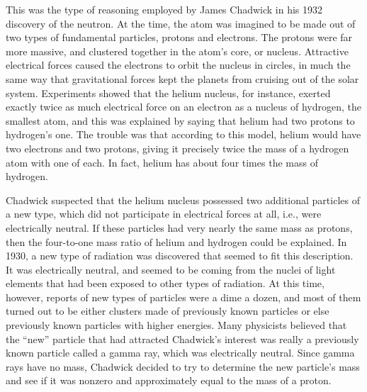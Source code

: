 This was the type of reasoning employed by James Chadwick in his 1932 discovery of
the neutron. At the time, the
atom was imagined to be made out of two types of fundamental
particles, protons and electrons.
The protons were far more massive, and clustered together in
the atom's core, or nucleus. Attractive
electrical forces caused
the electrons to orbit the nucleus in circles, in much the
same way that gravitational forces kept the planets from
cruising out of the solar system. Experiments showed that
the helium nucleus, for instance, exerted exactly twice as
much electrical force on an electron as a nucleus of
hydrogen, the smallest atom, and this was explained by
saying that helium had two protons to hydrogen's one. The
trouble was that according to this model, helium would have
two electrons and two protons, giving it precisely twice the
mass of a hydrogen atom with one of each. In fact, helium
has about four times the mass of hydrogen.

Chadwick suspected that the helium nucleus possessed two
additional particles of a new type, which did not participate
in electrical forces at all, i.e., were electrically neutral.
If these particles had very nearly the same mass as protons,
then the four-to-one mass ratio of helium and hydrogen could
be explained. In 1930, a new type of radiation was
discovered that seemed to fit this description. It was
electrically neutral, and seemed to be coming from the
nuclei of light elements that had been exposed to other
types of radiation. At this time, however, reports of new
types of particles were a dime a dozen, and most of them
turned out to be either clusters made of previously known
particles or else previously known particles with higher
energies. Many physicists believed that the ``new'' particle
that had attracted Chadwick's interest was really a
previously known particle called a gamma
ray, which was electrically neutral. Since gamma rays have
no mass, Chadwick decided to try to determine the new
particle's mass and see if it was nonzero and approximately
equal to the mass of a proton.


